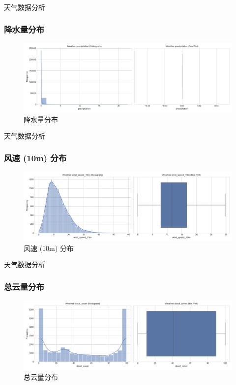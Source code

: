 \documentclass{beamer} %
\begin{document}
\begin{frame}{天气数据分析}
    \frametitle{降水量分布}
    \begin{figure}
        \centering
        \includegraphics[width=\textwidth]{../plots/weather_distribution_precipitation.png}
        \caption{降水量分布}
    \end{figure}
\end{frame}

\begin{frame}{天气数据分析}
    \frametitle{风速 (10m) 分布}
    \begin{figure}
        \centering
        \includegraphics[width=\textwidth]{../plots/weather_distribution_wind_speed_10m.png}
        \caption{风速 (10m) 分布}
    \end{figure}
\end{frame}

\begin{frame}{天气数据分析}
    \frametitle{总云量分布}
    \begin{figure}
        \centering
        \includegraphics[width=\textwidth]{../plots/weather_distribution_cloud_cover.png}
        \caption{总云量分布}
    \end{figure}
\end{frame}
\end{document}
